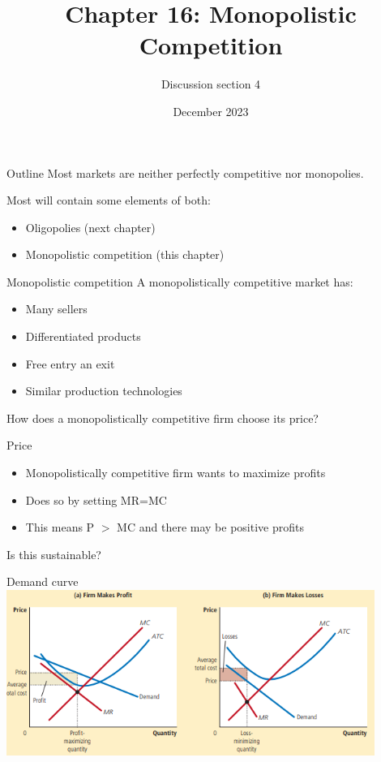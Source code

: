 \documentclass[aspectratio=169]{beamer}
\title{Chapter 16: Monopolistic Competition}
\author{Discussion section 4}
\date{December 2023}
\begin{document}
\begin{frame}
    \titlepage 
\end{frame}

\begin{frame}{Outline}
Most markets are neither perfectly competitive nor monopolies.

\vspace{5mm}

Most will contain some elements of both:
\begin{itemize}
    \item Oligopolies (next chapter)
    \item Monopolistic competition (this chapter)
\end{itemize}
\end{frame}

\begin{frame}{Monopolistic competition}
    A monopolistically competitive market has:
    \begin{itemize}
        \item Many sellers
        \item Differentiated products
        \item Free entry an exit
        \item Similar production technologies
    \end{itemize}

    How does a monopolistically competitive firm choose its price?
\end{frame}

\begin{frame}{Price}
    \begin{itemize}
        \item Monopolistically competitive firm wants to maximize profits
        \item Does so by setting MR=MC
        \item This means P $>$ MC and there may be positive profits
    \end{itemize}

    Is this sustainable?
\end{frame}

\begin{frame}{Demand curve}
    \centering
    \includegraphics[width = 0.9\textwidth,keepaspectratio]{../figs/MCprofit.png}
\end{frame}
\end{document}
